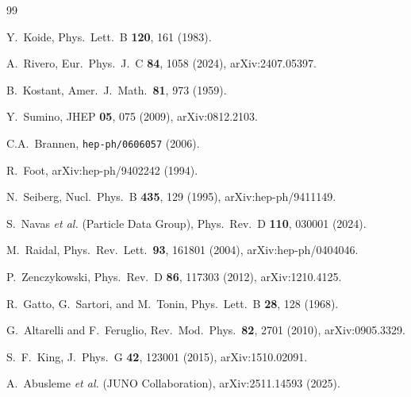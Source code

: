 \documentclass[aps,prl,twocolumn,showpacs,preprintnumbers,superscriptaddress]{revtex4-2}
\begin{document}
\begin{thebibliography}{99}

  Y.~Koide,
  Phys.\ Lett.\ B \textbf{120}, 161 (1983).

  A.~Rivero,
  Eur.\ Phys.\ J.\ C \textbf{84}, 1058 (2024),
  arXiv:2407.05397.

  B.~Kostant,
  Amer.\ J.\ Math.\ \textbf{81}, 973 (1959).

  Y.~Sumino,
  JHEP \textbf{05}, 075 (2009),
  arXiv:0812.2103.

  C.A.~Brannen,
  \texttt{hep-ph/0606057} (2006).

  R.~Foot,
  arXiv:hep-ph/9402242 (1994).

  N.~Seiberg,
  Nucl.\ Phys.\ B \textbf{435}, 129 (1995),
  arXiv:hep-ph/9411149.

  S.~Navas \textit{et al.} (Particle Data Group),
  Phys.\ Rev.\ D \textbf{110}, 030001 (2024).

  M.~Raidal,
  Phys.\ Rev.\ Lett.\ \textbf{93}, 161801 (2004),
  arXiv:hep-ph/0404046.

  P.~Zenczykowski,
  Phys.\ Rev.\ D \textbf{86}, 117303 (2012),
  arXiv:1210.4125.

  R.~Gatto, G.~Sartori, and M.~Tonin,
  Phys.\ Lett.\ B \textbf{28}, 128 (1968).

  G.~Altarelli and F.~Feruglio,
  Rev.\ Mod.\ Phys.\ \textbf{82}, 2701 (2010),
  arXiv:0905.3329.

  S.~F.~King,
  J.\ Phys.\ G \textbf{42}, 123001 (2015),
  arXiv:1510.02091.

  A.~Abusleme \textit{et al.} (JUNO Collaboration),
  arXiv:2511.14593 (2025).

\end{thebibliography}
\end{document}
